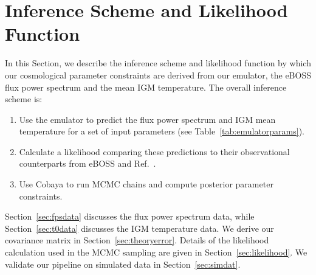 \section{Inference Scheme and Likelihood Function}\label{sec:inference}


In this Section, we describe the inference scheme and likelihood function by which our cosmological parameter constraints are derived from our emulator, the eBOSS flux power spectrum \cite{2019JCAP...07..017C} and the mean IGM temperature. The overall inference scheme is:
\begin{enumerate}
    \item Use the emulator to predict the flux power spectrum and IGM mean temperature for a set of input parameters (see Table~\ref{tab:emulatorparams}).
    \item Calculate a likelihood comparing these predictions to their observational counterparts from eBOSS \cite{2019JCAP...07..017C} and Ref.~\cite{2021MNRAS.506.4389G}.
    \item Use Cobaya \cite{2021JCAP...05..057T, 2019ascl.soft10019T} to run MCMC chains and compute posterior parameter constraints.
\end{enumerate}
Section~\ref{sec:fpsdata} discusses the flux power spectrum data, while Section~\ref{sec:t0data} discusses the IGM temperature data. We derive our covariance matrix in Section~\ref{sec:theoryerror}. Details of the likelihood calculation used in the MCMC sampling are given in Section~\ref{sec:likelihood}. We validate our pipeline on simulated data in Section~\ref{sec:simdat}.



